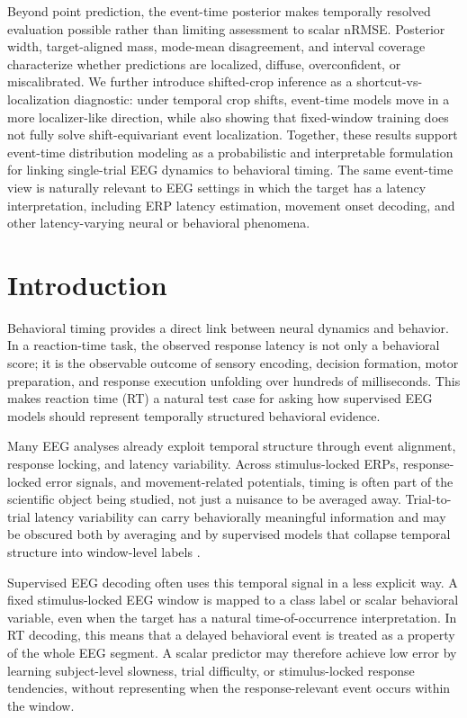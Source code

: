 \documentclass[12pt]{article}
\begin{document}
Beyond point prediction, the event-time posterior makes temporally resolved evaluation possible rather than limiting assessment to scalar nRMSE. Posterior width, target-aligned mass, mode-mean disagreement, and interval coverage characterize whether predictions are localized, diffuse, overconfident, or miscalibrated. We further introduce shifted-crop inference as a shortcut-vs-localization diagnostic: under temporal crop shifts, event-time models move in a more localizer-like direction, while also showing that fixed-window training does not fully solve shift-equivariant event localization. Together, these results support event-time distribution modeling as a probabilistic and interpretable formulation for linking single-trial EEG dynamics to behavioral timing. The same event-time view is naturally relevant to EEG settings in which the target has a latency interpretation, including ERP latency estimation, movement onset decoding, and other latency-varying neural or behavioral phenomena.






\section{Introduction}

Behavioral timing provides a direct link between neural dynamics and behavior. In a reaction-time task, the observed response latency is not only a behavioral score; it is the observable outcome of sensory encoding, decision formation, motor preparation, and response execution unfolding over hundreds of milliseconds. This makes reaction time (RT) a natural test case for asking how supervised EEG models should represent temporally structured behavioral evidence.

Many EEG analyses already exploit temporal structure through event alignment, response locking, and latency variability. Across stimulus-locked ERPs, response-locked error signals, and movement-related potentials, timing is often part of the scientific object being studied, not just a nuisance to be averaged away. Trial-to-trial latency variability can carry behaviorally meaningful information and may be obscured both by averaging and by supervised models that collapse temporal structure into window-level labels \citep{Jung1998SingleTrialERP,Ouyang2017LatencyReview}.

Supervised EEG decoding often uses this temporal signal in a less explicit way. A fixed stimulus-locked EEG window is mapped to a class label or scalar behavioral variable, even when the target has a natural time-of-occurrence interpretation. In RT decoding, this means that a delayed behavioral event is treated as a property of the whole EEG segment. A scalar predictor may therefore achieve low error by learning subject-level slowness, trial difficulty, or stimulus-locked response tendencies, without representing when the response-relevant event occurs within the window.
\end{document}

